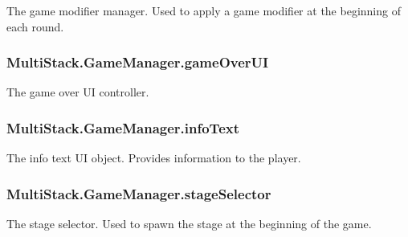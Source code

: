 The game modifier manager. Used to apply a game modifier at the beginning of each round. 

\hypertarget{class_multi_stack_1_1_game_manager_a6b33f48d117d4db0a6873b1028eebb38}{}
\subsubsection[{game\+Over\+U\+I}]{ Multi\+Stack.\+Game\+Manager.\+game\+Over\+U\+I}\label{class_multi_stack_1_1_game_manager_a6b33f48d117d4db0a6873b1028eebb38}


The game over U\+I controller. 

\hypertarget{class_multi_stack_1_1_game_manager_a479c44610a6637e259add0fa0c3128e4}{}
\subsubsection[{info\+Text}]{ Multi\+Stack.\+Game\+Manager.\+info\+Text}\label{class_multi_stack_1_1_game_manager_a479c44610a6637e259add0fa0c3128e4}


The info text U\+I object. Provides information to the player. 

\hypertarget{class_multi_stack_1_1_game_manager_a5a526de2c9547502f5a8613d609624ef}{}
\subsubsection[{stage\+Selector}]{ Multi\+Stack.\+Game\+Manager.\+stage\+Selector}\label{class_multi_stack_1_1_game_manager_a5a526de2c9547502f5a8613d609624ef}


The stage selector. Used to spawn the stage at the beginning of the game. 

\hypertarget{class_multi_stack_1_1_game_manager_aa3378e26e4669efb5cc272dfb2c80d6a}{}
